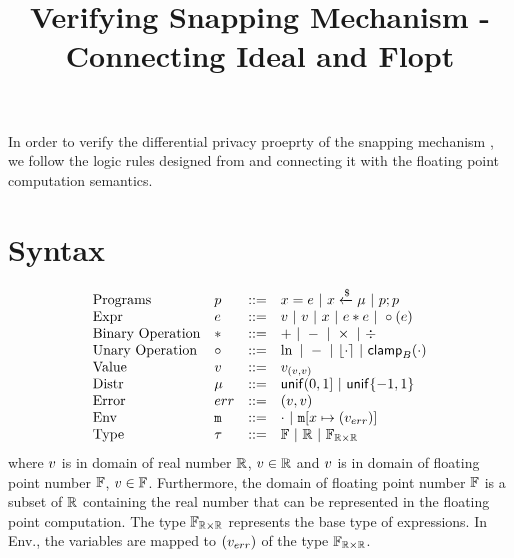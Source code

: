 \documentclass[a4paper,11pt]{article}
\begin{document}
\title{Verifying Snapping Mechanism - Connecting Ideal and Flopt}
\author{}

\date{}

\maketitle
In order to verify the differential privacy proeprty of
the snapping mechanism \cite{mironov2012significance},
we follow the logic rules designed from
\cite{barthe2016proving} and connecting 
it with the floating point computation semantics.
\section{Syntax}
\[\begin{array}{llll}
\mbox{Programs} & \prog & ::= & 
     \varx = \expr ~|~ \varx \samplel \edistr
	~|~ \prog ; \prog \\

\mbox{Expr} & \expr & ::= & \rval  ~|~  \fval
	~|~ \varx  ~|~ \expr \bop \expr
	~|~ \uop (\expr) \\
%
\mbox{Binary Operation} & \bop & ::= & + ~|~ - ~|~ \times ~|~ \div \\
%
\mbox{Unary Operation} & \uop & ::= & \ln ~|~ - ~|~ \round{\cdot} 
	~|~ \clamp_B(\cdot) \\
%
\mbox{Value} & \valv & ::= & \fval_{(\rval, \rval)}\\
%
\mbox{Distr} & \edistr & ::= & \uniform(0, 1]
%
	~|~ \uniform\{-1, 1\}\\ 
%
\mbox{Error} & \err & ::= & (\rval, \rval) \\
%
\mbox{Env} & \trsmem & ::= & \cdot ~|~ \trsmem[x \mapsto (\fval_{\err})]\\
%
\mbox{Type} & \tau & ::= & \float ~|~ \real ~|~ \float_{\real \times \real}
\end{array}
\]
where $v$ is in domain of real number $\mathbb{R}$, $v \in \mathbb{R}$ and $v$ is in domain of floating point number $\mathbb{F}$, $v \in \mathbb{F}$. Furthermore, the domain of floating point number $\mathbb{F}$ is a subset of $\mathbb{R}$ containing the real number that can be represented in the floating point computation. The type $\mathbb{F}_{\mathbb{R} \times \mathbb{R}}$ represents the base type of expressions. In Env., the variables are mapped to $(v_{err})$ of the type $\mathbb{F}_{\mathbb{R} \times \mathbb{R}}$.


%
\end{document}
